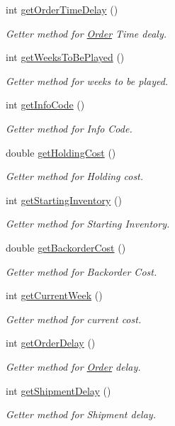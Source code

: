 \begin{DoxyCompactItemize}
int \hyperlink{class_game_a61aed9159fe6130486be8034f3e28086}{get\+Order\+Time\+Delay} ()
\begin{DoxyCompactList}\small\item\em Getter method for \hyperlink{class_order}{Order} Time dealy. \end{DoxyCompactList}\item 
int \hyperlink{class_game_ad9d402aa7fdf97b4cbfa9e8e04301da0}{get\+Weeks\+To\+Be\+Played} ()
\begin{DoxyCompactList}\small\item\em Getter method for weeks to be played. \end{DoxyCompactList}\item 
int \hyperlink{class_game_a16cbdc46bd7268319249affa2f24ef3a}{get\+Info\+Code} ()
\begin{DoxyCompactList}\small\item\em Getter method for Info Code. \end{DoxyCompactList}\item 
double \hyperlink{class_game_a7bba0862ffb4fc160a491c982f70a113}{get\+Holding\+Cost} ()
\begin{DoxyCompactList}\small\item\em Getter method for Holding cost. \end{DoxyCompactList}\item 
int \hyperlink{class_game_aab81a9ebaccae9567297d73a44204e0d}{get\+Starting\+Inventory} ()
\begin{DoxyCompactList}\small\item\em Getter method for Starting Inventory. \end{DoxyCompactList}\item 
double \hyperlink{class_game_ab29ec1e3f5dd71e0f67b3bda884ff166}{get\+Backorder\+Cost} ()
\begin{DoxyCompactList}\small\item\em Getter method for Backorder Cost. \end{DoxyCompactList}\item 
int \hyperlink{class_game_aa131c51d4b09434ec8986048483ef17e}{get\+Current\+Week} ()
\begin{DoxyCompactList}\small\item\em Getter method for current cost. \end{DoxyCompactList}\item 
int \hyperlink{class_game_ab8a2d3843e55b53345bdb80b6b1e6503}{get\+Order\+Delay} ()
\begin{DoxyCompactList}\small\item\em Getter method for \hyperlink{class_order}{Order} delay. \end{DoxyCompactList}\item 
int \hyperlink{class_game_a9e3acf4f2ee399be2eb047ed036bc24f}{get\+Shipment\+Delay} ()
\begin{DoxyCompactList}\small\item\em Getter method for Shipment delay. \end{DoxyCompactList}\end{DoxyCompactItemize}
